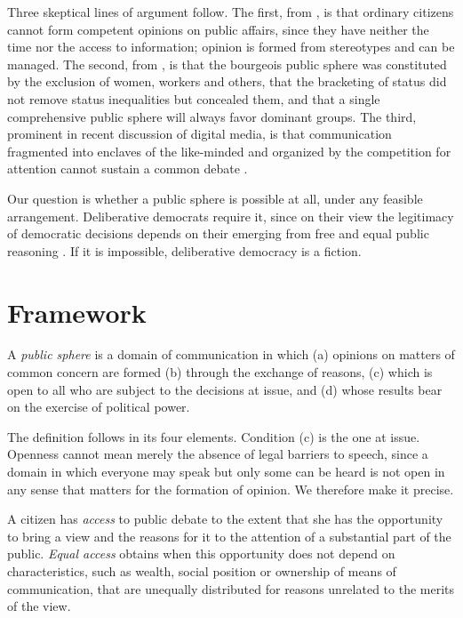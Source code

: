 \documentclass{situationist-preprint}
\begin{document}
Three skeptical lines of argument follow. The first, from \citet{Lippmann1922}, is that ordinary citizens cannot form competent opinions on public affairs, since they have neither the time nor the access to information; opinion is formed from stereotypes and can be managed. The second, from \citet{Fraser1990}, is that the bourgeois public sphere was constituted by the exclusion of women, workers and others, that the bracketing of status did not remove status inequalities but concealed them, and that a single comprehensive public sphere will always favor dominant groups. The third, prominent in recent discussion of digital media, is that communication fragmented into enclaves of the like-minded and organized by the competition for attention cannot sustain a common debate \citep{Sunstein2001}.

Our question is whether a public sphere is possible at all, under any feasible arrangement. Deliberative democrats require it, since on their view the legitimacy of democratic decisions depends on their emerging from free and equal public reasoning \citep{Cohen1989}. If it is impossible, deliberative democracy is a fiction.

\section{Framework}

\begin{definition}\label{d:sphere}
A \emph{public sphere} is a domain of communication in which (a) opinions on matters of common concern are formed (b) through the exchange of reasons, (c) which is open to all who are subject to the decisions at issue, and (d) whose results bear on the exercise of political power.
\end{definition}

The definition follows \citet{Habermas1996} in its four elements. Condition (c) is the one at issue. Openness cannot mean merely the absence of legal barriers to speech, since a domain in which everyone may speak but only some can be heard is not open in any sense that matters for the formation of opinion. We therefore make it precise.

\begin{definition}\label{d:access}
A citizen has \emph{access} to public debate to the extent that she has the opportunity to bring a view and the reasons for it to the attention of a substantial part of the public. \emph{Equal access} obtains when this opportunity does not depend on characteristics, such as wealth, social position or ownership of means of communication, that are unequally distributed for reasons unrelated to the merits of the view.
\end{definition}
\end{document}
